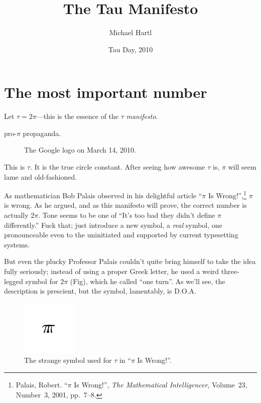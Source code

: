 \documentclass{article}
\begin{document}
\title{The Tau Manifesto}
\author{Michael Hartl}
\date{Tau Day, 2010}
\maketitle

\section{The most important number} %
\label{sec:the_most_important_number}

Let $\tau = 2\pi$---this is the essence of the $\tau$ \emph{manifesto}.


pro-$\pi$ propaganda.

\begin{figure}
\begin{center}
\end{center}
\caption{The Google logo on March 14, 2010.\label{fig:google-pi-day}}
\end{figure}


This is $\tau$. It is the true circle constant. After seeing how awesome $\tau$ is, $\pi$ will seem lame and old-fashioned.


As mathematician Bob Palais observed in his delightful article ``$\pi$ Is Wrong!'',\footnote{Palais, Robert. ``$\pi$ Is Wrong!'', \emph{The Mathematical Intelligencer}, Volume~23, Number~3, 2001, pp.~7--8.} $\pi$ is wrong. As he argued, and as this manifesto will prove, the correct number is actually $2\pi$. Tone seems to be one of ``It's too bad they didn't define $\pi$ differently.'' Fuck that; just introduce a new symbol, a \emph{real} symbol, one pronounceable even to the uninitiated and supported by current typesetting systems.

But even the plucky Professor Palais couldn't quite bring himself to take the idea fully seriously;  instead of using a proper Greek letter, he used a weird three-legged symbol for $2\pi$ (Fig), which he called ``one turn''. As we'll see, the description is prescient, but the symbol, lamentably, is D.O.A. 

\begin{figure}
\begin{center}
\includegraphics{images/figures/palais-tau.png}
\end{center}
\caption{The strange symbol used for $\tau$ in ``$\pi$ Is Wrong!''.\label{fig:palais-tau}}
\end{figure}
\end{document}

